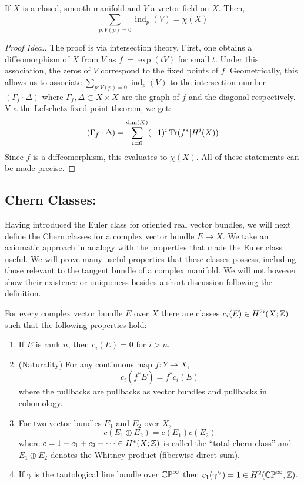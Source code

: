 \documentclass[12pt]{article}
\begin{document}
\begin{theorem}
    If $X$ is a closed, smooth manifold and $V$ a vector field on $X$. Then, 
    \[  \sum_{p: V(p) = 0} \operatorname{ind}_p(V) = \chi(X)\]
\end{theorem}
\begin{proof}[Proof Idea.]
    The proof is via intersection theory. First, one obtains a diffeomorphism of $X$ from $V$ as $f:= \exp(tV)$ for small $t$. Under this association, the zeros of $V$ correspond to the fixed points of $f$. Geometrically, this allows us to associate $\sum_{p: V(p) = 0} \operatorname{ind}_p(V)$ to the intersection number $(\Gamma_f \cdot \Delta)$ where $\Gamma_f, \Delta \subset X \times X$ are the graph of $f$ and the diagonal respectively. Via the Lefschetz fixed point theorem, we get:
    \[ (\Gamma_f \cdot \Delta) = \sum_{i=0}^{\dim(X)} (-1)^i \operatorname{Tr}(f^*|H^i(X))\]
    Since $f$ is a diffeomorphism, this evaluates to $\chi(X)$. All of these statements can be made precise.
\end{proof}

\subsection{Chern Classes:}
Having introduced the Euler class for oriented real vector bundles, we will next define the Chern classes for a complex vector bundle $E \to X$. We take an axiomatic approach in analogy with the properties that made the Euler class useful. We will prove many useful properties that these classes possess, including those relevant to the tangent bundle of a complex manifold. We will not however show their existence or uniqueness besides a short discussion following the definition.

\begin{definition}
    For every complex vector bundle $E$ over $X$ there are classes $c_i(E) \in H^{2i}(X; \mathbb Z)$ such that the following properties hold: 
    \begin{enumerate}
        \item If $E$ is rank $n$, then $c_i(E) = 0$ for $i > n$.
        \item (Naturality) For any continuous map $f: Y \to X$, 
        \[ c_i(f^*E) = f^*c_i(E)\]
        where the pullbacks are pullbacks as vector bundles and pullbacks in cohomology.
        \item For two vector bundles $E_1$ and $E_2$ over $X$, 
        \[  c(E_1 \oplus E_2) = c(E_1)c(E_2)\]
        where $c = 1 + c_1 + c_2 + \cdots \in H^*(X; \mathbb Z)$ is called the ``total chern class'' and $E_1 \oplus E_2$ denotes the Whitney product (fiberwise direct sum). 
        \item If $\gamma$ is the tautological line bundle over $\mathbb{CP}^\infty$ then $c_1(\gamma^\vee) = 1 \in H^2(\mathbb{CP}^\infty, \mathbb Z)$.
    \end{enumerate}
\end{definition}
\end{document}
